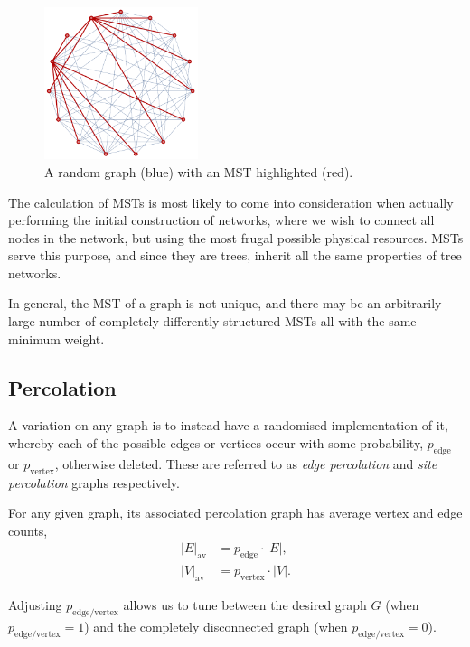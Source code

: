 \begin{figure}[!htbp]
\includegraphics[clip=true, width=0.4\textwidth]{MST}
\captionspacefig \caption{A random graph (blue) with an MST highlighted (red).} \label{fig:mst}
\end{figure}

The calculation of MSTs is most likely to come into consideration when actually performing the initial construction of networks, where we wish to connect all nodes in the network, but using the most frugal possible physical resources. MSTs serve this purpose, and since they are trees, inherit all the same properties of tree networks.

In general, the MST of a graph is not unique, and there may be an arbitrarily large number of completely differently structured MSTs all with the same minimum weight.

%
%

\subsection{Percolation}\label{sec:perc_topol}

A variation on any graph is to instead have a randomised implementation of it, whereby each of the possible edges or vertices occur with some probability, $p_\mathrm{edge}$ or $p_\mathrm{vertex}$, otherwise deleted. These are referred to as \textit{edge percolation} and \textit{site percolation} graphs respectively.

For any given graph, its associated percolation graph has average vertex and edge counts,
\begin{align}
|E|_\mathrm{av} &= p_\mathrm{edge}\cdot |E|,\nonumber\\
|V|_\mathrm{av} &= p_\mathrm{vertex}\cdot |V|.
\end{align}

Adjusting $p_\mathrm{edge/vertex}$ allows us to tune between the desired graph $G$ (when $p_\mathrm{edge/vertex}=1$) and the completely disconnected graph (when $p_\mathrm{edge/vertex}=0$).

